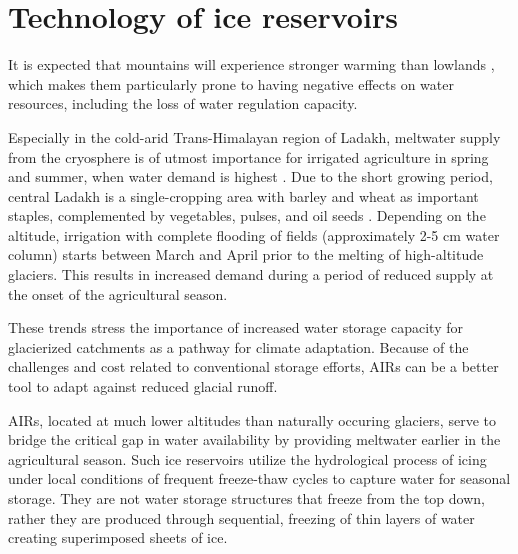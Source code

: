 \chapter{Technology of ice reservoirs}
\label{chap:tech}


It is expected that mountains will experience stronger warming than lowlands
\citep{ragettliContrastingClimateChange2016}, which makes them particularly prone to having negative effects on
water resources, including the loss of water regulation capacity. 

Especially in the cold-arid Trans-Himalayan region of Ladakh, meltwater supply from the cryosphere is of utmost
importance for irrigated agriculture in spring and summer, when water demand is highest
\citep{nusserCryosphereFedIrrigationNetworks2019}. Due to the short growing period, central Ladakh is a
single-cropping area with barley and wheat as important staples, complemented by vegetables, pulses, and oil
seeds \citep{nusserSociohydrologyArtificialGlaciers2019}. Depending on the altitude, irrigation with complete
flooding of fields (approximately 2-5 cm water column) starts between March and April prior to the melting of
high-altitude glaciers. This results in increased demand during a period of reduced supply at the onset of the
agricultural season.

These trends stress the importance of increased water storage capacity for glacierized catchments as a pathway
for climate adaptation. Because of the challenges and cost related to conventional storage efforts, AIRs can be
a better tool to adapt against reduced glacial runoff. 

AIRs, located at much lower altitudes than naturally occuring glaciers, serve to bridge the critical gap in
water availability by providing meltwater earlier in the agricultural season. Such ice reservoirs utilize the
hydrological process of icing under local conditions of frequent freeze-thaw cycles to capture water for
seasonal storage. They are not water storage structures that freeze from the top down, rather they are produced
through sequential, freezing of thin layers of water creating superimposed sheets of ice.



